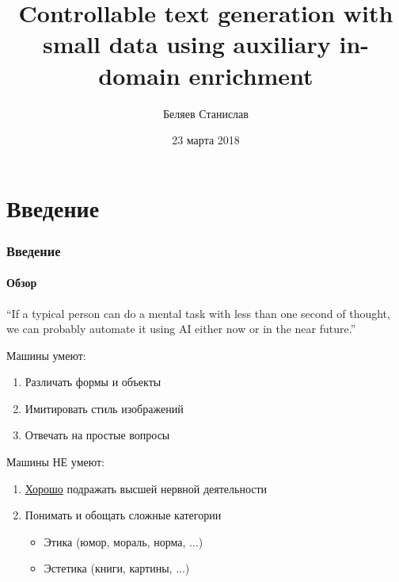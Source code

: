 \documentclass[10pt]{beamer}
\title[Controllable text generation]{Controllable text generation with small data using auxiliary in-domain enrichment}
\author{Беляев Станислав}
\institute[СПбАУ]
{
Санкт-Петербургский Академический Университет \\
\medskip
\textit{stasbelyaev96@gmail.com}
}
\date{23 марта 2018}
\begin{document}
\begin{frame}
\titlepage
\end{frame}
\section{Введение}
\begin{frame}
\frametitle{Введение}
\framesubtitle{Обзор}

\begin{exampleblock}{}
  {\Large “If a typical person can do a mental task with less than one second of thought, we can probably automate it using AI either now or in the near future.”}
  \vskip2mm
  \hspace*{}
\end{exampleblock}

Машины умеют:
\begin{enumerate}
    \item Различать формы и объекты
    \item Имитировать стиль изображений
    \item Отвечать на простые вопросы
\end{enumerate}

Машины НЕ умеют:
\begin{enumerate}
    \item \underline{Хорошо} подражать высшей нервной деятельности
    \item Понимать и обощать сложные категории
    \begin{itemize}
        \item Этика (юмор, мораль, норма, ...)
        \item Эстетика (книги, картины, ...)
    \end{itemize}
\end{enumerate}

\end{frame}
\end{document}
